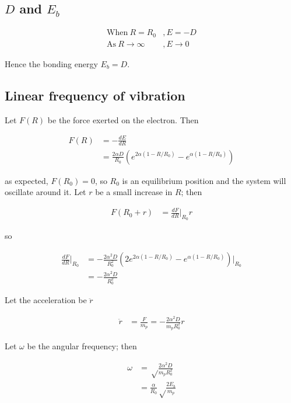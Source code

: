 \documentclass{article}
\begin{document}
\subsection{$D$ and $E_b$}

\begin{align*}
\mathrm{When}\ R = R_0&, E = -D \\
\mathrm{As}\ R \rightarrow \infty&, E \rightarrow 0
\end{align*}

Hence the bonding energy $E_b = D$.

\subsection{Linear frequency of vibration}

Let $F(R)$ be the force exerted on the electron. Then

\begin{align*}
F(R) &= -\frac{dE}{dR} \\
&= \frac{2\alpha D}{R_0}\left(e^{2\alpha(1-R/R_0)} - e^{\alpha(1 - R/R_0)}\right)
\end{align*}

as expected, $F(R_0) = 0$, so $R_0$ is an equilibrium position and the system will oscillate around it. Let $r$ be a small increase in $R$; then

\begin{align*}
F(R_0 + r) &= \frac{dF}{dR}\Big|_{R_0} r
\end{align*}

so

\begin{align*}
\frac{dF}{dR}\Big|_{R_0} &= -\frac{2\alpha^2D}{R_0^2} \left(2e^{2\alpha(1-R/R_0)} - e^{\alpha(1-R/R_0)}\right) \Big|_{R_0} \\
&= -\frac{2\alpha^2D}{R_0^2}
\end{align*}

Let the acceleration be $\ddot{r}$

\begin{align*}
\ddot{r} &= \frac{F}{m_p} = -\frac{2\alpha^2D}{m_pR_0^2} r
\end{align*}

Let $\omega$ be the angular frequency; then 

\begin{align*}
\omega &= \sqrt\frac{2\alpha^2D}{m_pR_0^2} \\
&= \frac{\alpha}{R_0}\sqrt\frac{2E_b}{m_p}
\end{align*}
\end{document}
